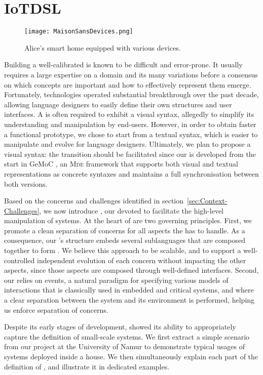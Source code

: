 \section{IoTDSL}
\label{sec:IoTDSL}

\begin{figure}%
\texttt{[image: MaisonSansDevices.png]}%
\caption{Alice's smart home equipped with various devices.}%
\label{fig:RE}%
\end{figure}

Building a well-calibrated \DSL is known to be difficult and error-prone. It usually requires a large expertise on a domain and its many variations before a consensus on which concepts are important and how to effectively represent them emerge. Fortunately, \MDE technologies operated substantial breakthrough over the past decade, allowing language designers to easily define their own \DSL structures and user interfaces. A \DSL is often required to exhibit a visual syntax, allegedly to simplify its understanding and manipulation by end-users. However, in order to obtain faster a functional prototype, we chose to start from a textual syntax, which is easier to manipulate and evolve for language designers. Ultimately, we plan to propose a visual syntax: the transition should be facilitated since our \DSL is developed from the start in GeMoC \cite{combemale-14}, an \textsc{Mde} framework that supports both visual and textual representations as concrete syntaxes and maintains a full synchronisation between both versions.

Based on the concerns and challenges identified in section~\ref{sec:Context-Challenges}, we now introduce \IOTDSL, our \DSL devoted to facilitate the high-level manipulation of \IOT systems. At the heart of \IOTDSL are two governing principles. First, we promote a clean separation of concerns for all aspects the \DSL has to handle. As a consequence, our \DSL's structure embeds several sublanguages that are composed together to form \IOTDSL. We believe this approach to be scalable, and to support a well-controlled independent evolution of each concern without impacting the other aspects, since those aspects are composed through well-defined interfaces. Second, our \DSL relies on events, a natural paradigm for specifying various models of interactions that is classically used in embedded and critical systems, and where a clear separation between the system and its environment is performed, helping us enforce separation of concerns.

Despite its early stages of development, \IOTDSL showed its ability to appropriately capture the definition of small-scale \IOT systems. We first extract a simple scenario from our project at the University of Namur to demonstrate typical usages of \IOT systems deployed inside a house. We then simultaneously explain each part of the definition of \IOTDSL, and illustrate it in dedicated examples.

